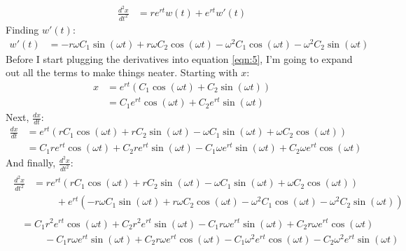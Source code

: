 \documentclass[11pt]{article}
\begin{document}
\begin{enumerate}[label={\textbf{\arabic*.}}]
{\begin{enumerate}[label={\textbf{(\alph*)}}]
{                    \begin{align*}
                        \frac{d^2x}{dt^2}&=re^{rt}w(t)+e^{rt}w'(t)
                    \end{align*}
                    Finding $w'(t)$:
                    \begin{align*}
                        w'(t)&=-r\omega C_1\sin(\omega t)+r\omega C_2\cos(\omega t)-\omega^2C_1\cos(\omega t)-\omega^2C_2\sin(\omega t)
                    \end{align*}
                    Before I start plugging the derivatives into equation \ref{eqn:5}, I'm going to expand out all the terms to make things neater. Starting with $x$:
                    \begin{align*}
                        x&=e^{rt}(C_1\cos(\omega t)+C_2\sin(\omega t)) \\
                        &=C_1e^{rt}\cos(\omega t)+C_2e^{rt}\sin(\omega t)
                    \end{align*}
                    Next, $\frac{dx}{dt}$:
                    \begin{align*}
                        \frac{dx}{dt}&=e^{rt}(rC_1\cos(\omega t)+rC_2\sin(\omega t)-\omega C_1\sin(\omega t)+\omega C_2\cos(\omega t)) \\
                        &=C_1re^{rt}\cos(\omega t)+C_2re^{rt}\sin(\omega t)-C_1\omega e^{rt}\sin(\omega t)+C_2\omega e^{rt}\cos(\omega t)
                    \end{align*}
                    And finally, $\frac{d^2x}{dt^2}$:
                    \begin{align*}
                        \begin{split}
                            \frac{d^2x}{dt^2}&=re^{rt}(rC_1\cos(\omega t)+rC_2\sin(\omega t)-\omega C_1\sin(\omega t)+\omega C_2\cos(\omega t)) \\
                            &\phantom{=}\quad {}+e^{rt}(-r\omega C_1\sin(\omega t)+r\omega C_2\cos(\omega t)-\omega^2C_1\cos(\omega t)-\omega^2C_2\sin(\omega t))
                        \end{split} \\[8pt]
                        \begin{split}
                            &=C_1r^2e^{rt}\cos(\omega t)+C_2r^2e^{rt}\sin(\omega t)-C_1r\omega e^{rt}\sin(\omega t)+C_2r\omega e^{rt}\cos(\omega t) \\
                            &\phantom{=}\quad {}-C_1r\omega e^{rt}\sin(\omega t)+C_2r\omega e^{rt}\cos(\omega t)-C_1\omega^2e^{rt}\cos(\omega t)-C_2\omega^2e^{rt}\sin(\omega t)

\end{split}
\end{align*}}
\end{enumerate}}
\end{enumerate}
\end{document}
